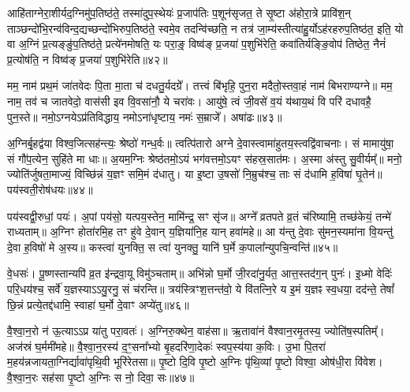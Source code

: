 आहि॑ताग्नेरा॒शीर्यद॒ग्निमु॑प॒तिष्ठ॑ते॒ तस्मा॑दुप॒स्थेयः॑ प्र॒जाप॑तिः प॒शून॑सृजत॒ ते सृ॒ष्टा अ॑होरा॒त्रे प्रावि॑श॒न् ताञ्छन्दो॑भि॒रन्व॑विन्द॒द्यच्छन्दो॑भिरुप॒तिष्ठ॑ते॒ स्वमे॒व तदन्वि॑च्छति॒ न तत्र॑ जा॒म्य॑स्तीत्या॑हु॒र्यो\-ऽह॑रहरुप॒तिष्ठ॑त॒ इति॒ यो वा अ॒ग्निं प्र॒त्यङ्ङु॑प॒तिष्ठ॑ते॒ प्रत्ये॑नमोषति॒ यः परा॒ङ्॒ विष्व॑ङ् प्र॒जया॑ प॒शुभि॑रेति॒ कवा॑तिर्यङ्ङि॒वोप॑ तिष्ठेत॒ नैनं॑ प्र॒त्योष॑ति॒ न विष्व॑ङ् प्र॒जया॑ प॒शुभि॑रेति॥४२॥

{\anuvakamend[{सि॒क्तस्य॑ स॒ह भ॑वति॒ यो यत्खलु॒ वै प॒शुभि॒स्त्रयो॑दश च॥९॥}]}

मम॒ नाम॑ प्रथ॒मं जा॑तवेदः पि॒ता मा॒ता च॑ दधतु॒र्यदग्रे᳚। तत्त्वं बि॑भृहि॒ पुन॒रा मदैतो॒स्तवा॒हं नाम॑ बिभराण्यग्ने॥ मम॒ नाम॒ तव॑ च जातवेदो॒ वास॑सी इव वि॒वसा॑नौ॒ ये चरा॑वः। आयु॑षे॒ त्वं जी॒वसे॑ व॒यं य॑थाय॒थं वि परि॑ दधावहै॒ पुन॒स्ते॥ नमो॒\-ऽग्नये\-ऽप्र॑तिविद्धाय॒ नमो\-ऽना॑धृष्टाय॒ नमः॑ स॒म्राजे᳚। अषा॑ढः॥४३॥

अ॒ग्निर्बृ॒हद्व॑या विश्व॒जित्सह॑न्त्यः॒ श्रेष्ठो॑ गन्ध॒र्वः॥ त्वत्पि॑तारो अग्ने दे॒वास्त्वामा॑हुतय॒स्त्वद्वि॑वाचनाः। सं मामायु॑षा॒ सं गौ॑प॒त्येन॒ सुहि॑ते मा धाः॥ अ॒यम॒ग्निः श्रेष्ठ॑तमो॒\-ऽयं भग॑वत्तमो॒\-ऽयꣳ स॑हस्र॒सात॑मः। अ॒स्मा अ॑स्तु सु॒वीर्यम्᳚॥ मनो॒ ज्योति॑र्जुषता॒माज्यं॒ विच्छि॑न्नं य॒ज्ञꣳ समि॒मं द॑धातु। या इ॒ष्टा उ॒षसो॑ नि॒म्रुच॑श्च॒ ताः सं द॑धामि ह॒विषा॑ घृ॒तेन॑॥ पय॑स्वती॒रोष॑धयः॥४४॥

पय॑स्वद्वी॒रुधां॒ पयः॑। अ॒पां पय॑सो॒ यत्पय॒स्तेन॒ मामि॑न्द्र॒ सꣳ सृ॑ज॥ अग्ने᳚ व्रतपते व्र॒तं च॑रिष्यामि॒ तच्छ॑केयं॒ तन्मे॑ राध्यताम्॥ अ॒ग्निꣳ होता॑रमि॒ह तꣳ हु॑वे दे॒वान् य॒ज्ञिया॑नि॒ह यान् हवा॑महे॥ आ य॑न्तु दे॒वाः सु॑मन॒स्यमा॑ना वि॒यन्तु॑ दे॒वा ह॒विषो॑ मे अ॒स्य॥ कस्त्वा॑ युनक्ति॒ स त्वा॑ युनक्तु॒ यानि॑ घ॒र्मे क॒पाला᳚न्युपचि॒न्वन्ति॑॥४५॥

वे॒धसः॑। पू॒ष्णस्तान्यपि॑ व्र॒त इ॑न्द्रवा॒यू विमु॑ञ्चताम्॥ अभि॑न्नो घ॒र्मो जी॒रदा॑नु॒र्यत॒ आत्त॒स्तद॑ग॒न् पुनः॑। इ॒ध्मो वेदिः॑ परि॒धय॑श्च॒ सर्वे॑ य॒ज्ञस्या\-ऽ\-ऽयु॒रनु॒ सं च॑रन्ति॥ त्रय॑स्त्रिꣳश॒त्तन्त॑वो॒ ये वि॑तत्नि॒रे य इ॒मं य॒ज्ञꣴ स्व॒धया॒ दद॑न्ते॒ तेषां᳚ छि॒न्नं प्रत्ये॒तद्द॑धामि॒ स्वाहा॑ घ॒र्मो दे॒वाꣳ अप्ये॑तु॥४६॥

{}

वै॒श्वा॒न॒रो न॑ ऊ॒त्या\-ऽ\-ऽप्र या॑तु परा॒वतः॑। अ॒ग्निरु॒क्थेन॒ वाह॑सा॥ ऋ॒तावा॑नं वैश्वान॒रमृ॒तस्य॒ ज्योति॑ष॒स्पतिम्᳚। अज॑स्रं घ॒र्ममी॑महे॥ वै॒श्वा॒न॒रस्य॑ द॒ꣳ॒सना᳚भ्यो बृ॒हदरि॑णा॒देकः॑ स्वप॒स्य॑या क॒विः। उ॒भा पि॒तरा॑ म॒हय॑न्नजायता॒ग्निर्द्यावा॑पृथि॒वी भूरि॑रेतसा॥ पृ॒ष्टो दि॒वि पृ॒ष्टो अ॒ग्निः पृ॑थि॒व्यां पृ॒ष्टो विश्वा॒ ओष॑धी॒रा वि॑वेश। वै॒श्वा॒न॒रः सह॑सा पृ॒ष्टो अ॒ग्निः स नो॒ दिवा॒ सः॥४७॥

